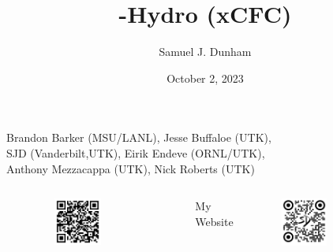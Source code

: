 \documentclass{beamer}
\title[NR Community Call]{\thornado-Hydro (xCFC)}
\author{Samuel J. Dunham}
\date{October 2, 2023}
\begin{document}
\begin{frame}

  \titlepage

  \begin{center}
    Brandon Barker (MSU/LANL), %
    Jesse Buffaloe (UTK), \\
    SJD (Vanderbilt,UTK), %
    Eirik Endeve (ORNL/UTK), \\
    Anthony Mezzacappa (UTK), %
    Nick Roberts (UTK)
  \end{center}

  \vspace{-1em}

  \begin{columns}[c]

      \begin{center}\thornado\end{center}
      \vspace{-1.5em}
      \begin{figure}[htb!]
        \centering
        \includegraphics[width=0.5\textwidth]{fig.thornado.png}
      \end{figure}

      \begin{center}My Website\end{center}
      \vspace{-1.5em}
      \begin{figure}[htb!]
        \centering
        \includegraphics[width=0.5\textwidth]{fig.website.png}
      \end{figure}

  \end{columns}

\end{frame}
\end{document}
